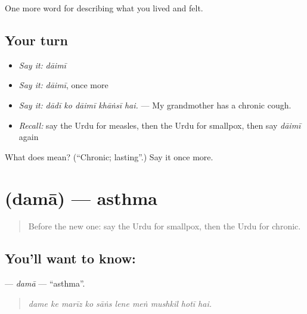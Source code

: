 \begin{grammarlens}[title={What you've built}]
One more word for describing what you lived and felt.
\end{grammarlens}

\subsection*{Your turn}
\begin{itemize}
\raggedright
  \item \emph{Say it:} \emph{dāimī}
  \item \emph{Say it:} \emph{dāimī}, once more
  \item \emph{Say it:} \emph{dādī ko dāimī khāṅsī hai.} — My grandmother has a chronic cough.
  \item \emph{Recall:} say the Urdu for measles, then the Urdu for smallpox, then say \emph{dāimī} again
\end{itemize}

\begin{tcolorbox}[breakable,colback=teal!4,colframe=teal!35!black,title={Before you move on}]
What does  mean? (\textquotedblleft{}Chronic; lasting\textquotedblright{}.) Say it once more.
\end{tcolorbox}
\section[\texorpdfstring{\ur{دمہ} (damā)}{دمہ (damā)}]{ (damā) — asthma}

\label{lesson:UR-C475-dama}



\begin{quote}
Before the new one: say the Urdu for smallpox, then the Urdu for chronic.
\end{quote}

\subsection*{You'll want to know: }
\textbf{} — \emph{damā} — \textquotedblleft{}asthma\textquotedblright{}.

\begin{quote}
         
\end{quote}

\begin{quote}
\emph{dame ke marīz ko sāṅs lene meṅ mushkil hotī hai.}
\end{quote}

